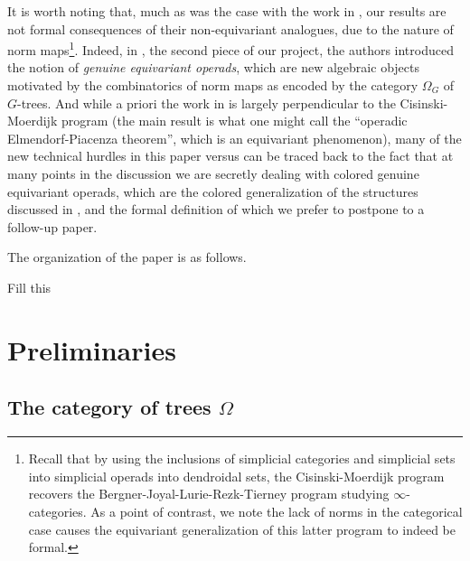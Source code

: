 \documentclass[a4paper,10pt,draft]{article}%
\begin{document}
It is worth noting that, much as was the case with the work in \cite{Per17}, our results are not formal consequences of their non-equivariant analogues, due to the nature of norm maps\footnote{Recall that by using the inclusions of simplicial categories and simplicial sets into simplicial operads into dendroidal sets, the Cisinski-Moerdijk program recovers the Bergner-Joyal-Lurie-Rezk-Tierney program studying $\infty$-categories. As a point of contrast, we note the lack of norms in the categorical case causes the equivariant generalization of this latter program to indeed be formal.}.
Indeed, in \cite{BP17}, the second piece of our project,
the authors introduced the notion of 
\textit{genuine equivariant operads},
which are new algebraic objects motivated by the combinatorics of norm maps as encoded by the category $\Omega_G$ of $G$-trees.
And while a priori the work in \cite{BP17} is largely perpendicular to the Cisinski-Moerdijk program
(the main result \cite[Thm. III]{BP17} is what one might call the 
``operadic Elmendorf-Piacenza theorem'', which is an equivariant phenomenon),
many of the new technical hurdles in this paper versus \cite{CM13a} can be traced back to the fact that
at many points in the discussion we are secretly dealing with colored genuine equivariant operads, 
which are the colored generalization of the structures discussed in \cite{BP17},
and the formal definition of which we prefer to postpone to a follow-up paper.

\vskip 10pt

The organization of the paper is as follows.

{\color{blue} Fill this}


\section{Preliminaries}

\subsection{The category of trees $\Omega$}
\end{document}
